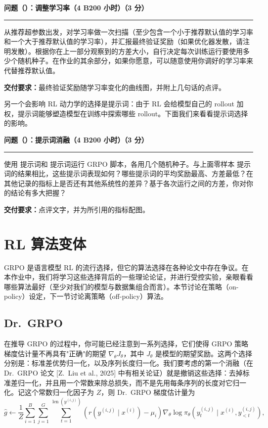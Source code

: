 \medskip
\noindent\textbf{问题（）：调整学习率（4 B200 小时）（3 分）}
\par\nobreak\smallskip\hrule\nobreak\medskip

从推荐超参数出发，对学习率做一次扫描（至少包含一个小于推荐默认值的学习率和一个大于推荐默认值的学习率），并汇报最终验证奖励（如果优化器发散，请注明发散）。根据你在上一部分观察到的方差大小，自行决定每次训练运行要使用多少个随机种子。在作业的其余部分，如果你愿意，可以随意使用你调好的学习率来代替推荐默认值。

\textbf{交付要求：}最终验证奖励随学习率变化的曲线图，并附上几句话的点评。

另一个会影响 RL 动力学的选择是提示词：由于 RL 会给模型自己的 rollout 加权，提示词能够塑造模型在训练中探索哪些 rollout。下面我们来看看提示词选择的影响。

\medskip
\noindent\textbf{问题（）：提示词消融（4 B200 小时）（3 分）}
\par\nobreak\smallskip\hrule\nobreak\medskip

使用  提示词和  提示词运行 GRPO 脚本，各用几个随机种子。与上面零样本  提示词的结果相比，这些提示词表现如何？哪些提示词的平均奖励最高、方差最低？在其他记录的指标上是否还有其他系统性的差异？基于各次运行之间的方差，你对你的结论有多大把握？

\textbf{交付要求：}点评文字，并为所引用的指标配图。

\section{RL 算法变体}

GRPO 是语言模型 RL 的流行选择，但它的算法选择在各种论文中存在争议。在本作业中，我们将学习这些选择背后的一些理论论证，并进行受控实验，亲眼看看哪些算法最好（至少对我们的模型与数据集组合而言）。本节讨论在策略（on-policy）设定，下一节讨论离策略（off-policy）算法。

\subsection{Dr.\ GRPO}

在推导 GRPO 的过程中，你可能已经注意到一系列选择，它们使得 GRPO 策略梯度估计量不再具有"正确"的期望 $\nabla_\theta J_\theta$，其中 $J_\theta$ 是模型的期望奖励。这两个选择分别是：标准差优势归一化，以及序列长度归一化。我们要考虑的第一个消融（在 Dr.\ GRPO 论文 [Z.\ Liu et al., 2025] 中有相关论证）就是撤销这些选择：去掉标准差归一化，并且用一个常数来除总损失，而不是先用每条序列的长度对它归一化。记这个常数归一化因子为 $Z$，则 Dr.\ GRPO 梯度估计量为
\begin{equation}
\hat{g} \leftarrow \frac{1}{Z} \sum_{i=1}^{B} \sum_{j=1}^{G} \sum_{t=1}^{\operatorname{len}\!\left(y^{(i,j)}\right)}
\left( r\!\left(y^{(i,j)} \mid x^{(i)}\right) - \mu_i \right)
\nabla_\theta \log \pi_\theta\!\left( y_t^{(i,j)} \mid x^{(i)}, y^{(i,j)}_{<t} \right),
\end{equation}
